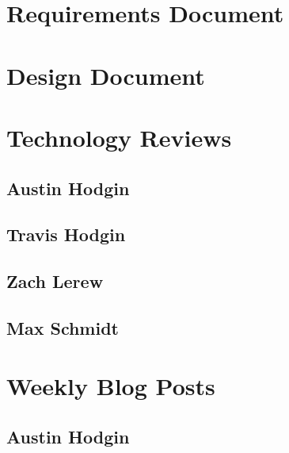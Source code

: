 \documentclass[onecolumn, draftclsnofoot,10pt, compsoc]{IEEEtran}
\begin{document}
	

	\section{Requirements Document}
	
	\section{Design Document}
	

	\section{Technology Reviews}
		\subsection{Austin Hodgin}
		
		\subsection{Travis Hodgin}
		
		\subsection{Zach Lerew}
		
		\subsection{Max Schmidt}
		

	\section{Weekly Blog Posts}
		\subsection{Austin Hodgin}
\end{document}
